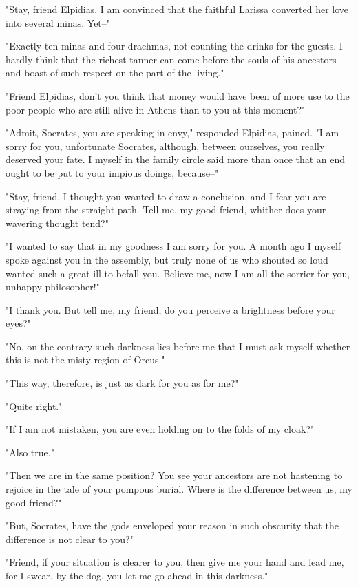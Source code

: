 "Stay, friend Elpidias. I am convinced that the faithful Larissa
converted her love into several minas. Yet--"

"Exactly ten minas and four drachmas, not counting the drinks for the
guests. I hardly think that the richest tanner can come before the
souls of his ancestors and boast of such respect on the part of the
living."

"Friend Elpidias, don't you think that money would have been of more
use to the poor people who are still alive in Athens than to you at
this moment?"

"Admit, Socrates, you are speaking in envy," responded Elpidias,
pained. "I am sorry for you, unfortunate Socrates, although, between
ourselves, you really deserved your fate. I myself in the family
circle said more than once that an end ought to be put to your impious
doings, because--"

"Stay, friend, I thought you wanted to draw a conclusion, and I fear
you are straying from the straight path. Tell me, my good friend,
whither does your wavering thought tend?"

"I wanted to say that in my goodness I am sorry for you. A month ago I
myself spoke against you in the assembly, but truly none of us who
shouted so loud wanted such a great ill to befall you. Believe me, now
I am all the sorrier for you, unhappy philosopher!"

"I thank you. But tell me, my friend, do you perceive a brightness
before your eyes?"

"No, on the contrary such darkness lies before me that I must ask
myself whether this is not the misty region of Orcus."

"This way, therefore, is just as dark for you as for me?"

"Quite right."

"If I am not mistaken, you are even holding on to the folds of my
cloak?"

"Also true."

"Then we are in the same position? You see your ancestors are not
hastening to rejoice in the tale of your pompous burial. Where is the
difference between us, my good friend?"

"But, Socrates, have the gods enveloped your reason in such obscurity
that the difference is not clear to you?"

"Friend, if your situation is clearer to you, then give me your hand
and lead me, for I swear, by the dog, you let me go ahead in this
darkness."

